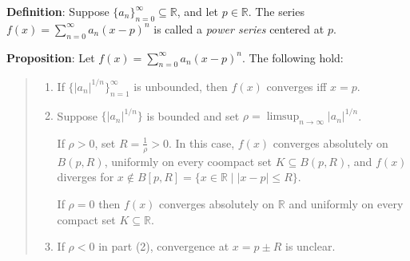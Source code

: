 \documentclass[11pt]{article}
\begin{document}
\textbf{Definition}: Suppose $\{a_n\}_{n=0}^\infty \subseteq \mathbb{R}$, and let $p \in \mathbb{R}$. The series $f(x) = \sum_{n=0}^\infty a_n (x-p)^n$ is called a \emph{power series} centered at $p$.

\textbf{Proposition}: Let $f(x) = \sum_{n=0}^\infty a_n (x-p)^n$. The following hold:
\begin{quote}\vspace{-0.3cm}
	\begin{enumerate}
	\item If $\{|a_n|^{1/n}\}_{n=1}^\infty$ is unbounded, then $f(x)$ converges iff $x = p$.
	\item Suppose $\{|a_n|^{1/n}\}$ is bounded and set $\rho = \limsup_{n \to \infty} |a_n|^{1/n}$.

	If $\rho > 0$, set $R = \frac{1}{\rho} > 0$. In this case, $f(x)$ converges absolutely on $B(p, R)$, uniformly on every coompact set $K \subseteq B(p, R)$, and $f(x)$ diverges for $x \notin B[p, R] = \{x \in \mathbb{R} \mid |x-p| \leq R\}$.

	If $\rho = 0$ then $f(x)$ converges absolutely on $\mathbb{R}$ and uniformly on every compact set $K \subseteq \mathbb{R}$.

	\item If $\rho < 0$ in part (2), convergence at $x = p \pm R$ is unclear.
	\end{enumerate}
\end{quote}
\end{document}
